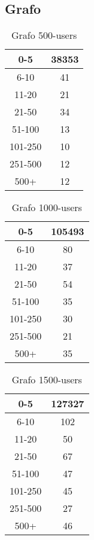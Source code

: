    \subsection{Grafo}
    \begin{table}[h!]
    \begin{tabular}{ |c|c| }
     \hline
     0-5 & 38353 \\
     \hline
     6-10 & 41 \\
     \hline
     11-20 & 21 \\
     \hline
     21-50 & 34 \\
     \hline
     51-100 & 13 \\
     \hline
     101-250 & 10 \\
     \hline
     251-500 & 12 \\
     \hline
     500+ & 12 \\
     \hline
    \end{tabular}
    \caption{Grafo 500-users}
    \end{table}
    \begin{table}[h!]
    \begin{tabular}{ |c|c| }
     \hline
     0-5 & 105493 \\
     \hline
     6-10 & 80 \\
     \hline
     11-20 & 37 \\
     \hline
     21-50 & 54 \\
     \hline
     51-100 & 35 \\
     \hline
     101-250 & 30 \\
     \hline
     251-500 & 21 \\
     \hline
     500+ & 35 \\
     \hline
    \end{tabular}
    \caption{Grafo 1000-users}
    \end{table}
    \begin{table}[h!]
    \begin{tabular}{ |c|c| }
     \hline
     0-5 & 127327 \\
     \hline
     6-10 & 102 \\
     \hline
     11-20 & 50 \\
     \hline
     21-50 & 67 \\
     \hline
     51-100 & 47 \\
     \hline
     101-250 & 45 \\
     \hline
     251-500 & 27 \\
     \hline
     500+ & 46 \\
     \hline
    \end{tabular}
    \caption{Grafo 1500-users}
    \end{table}

